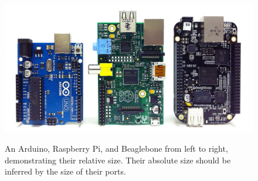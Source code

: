 \begin{figure}[H]
	\centering
	\caption{An Arduino, Raspberry Pi, and Beaglebone from left to right, demonstrating their relative size.  Their absolute size should be inferred by the size of their ports.}
	\includegraphics[width=.9\textwidth]{gfx/pi-arduino-beaglebone.jpg}
	\label{fig:pi-arduino-beaglebone}
\end{figure}
